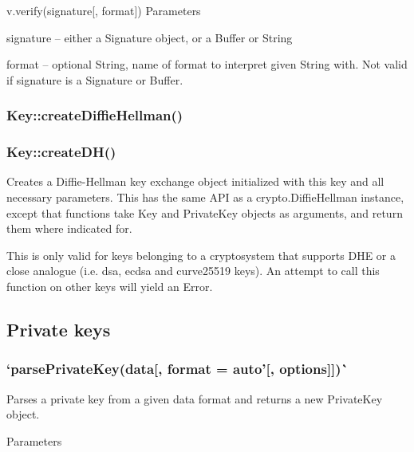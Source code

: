 {\ttfamily v.\+verify(signature\mbox{[}, format\mbox{]})} Parameters


\begin{DoxyItemize}
\item {\ttfamily signature} -- either a Signature object, or a Buffer or String
\item {\ttfamily format} -- optional String, name of format to interpret given String with. Not valid if {\ttfamily signature} is a Signature or Buffer.
\end{DoxyItemize}

\subsubsection*{{\ttfamily Key\+::create\+Diffie\+Hellman()}}

\subsubsection*{{\ttfamily Key\+::create\+D\+H()}}

Creates a Diffie-\/\+Hellman key exchange object initialized with this key and all necessary parameters. This has the same A\+PI as a {\ttfamily crypto.\+Diffie\+Hellman} instance, except that functions take {\ttfamily Key} and {\ttfamily Private\+Key} objects as arguments, and return them where indicated for.

This is only valid for keys belonging to a cryptosystem that supports D\+HE or a close analogue (i.\+e. {\ttfamily dsa}, {\ttfamily ecdsa} and {\ttfamily curve25519} keys). An attempt to call this function on other keys will yield an {\ttfamily Error}.

\subsection*{Private keys}

\subsubsection*{`parse\+Private\+Key(data\mbox{[}, format = \textquotesingle{}auto'\mbox{[}, options\mbox{]}\mbox{]})\`{}}

Parses a private key from a given data format and returns a new {\ttfamily Private\+Key} object.

Parameters


